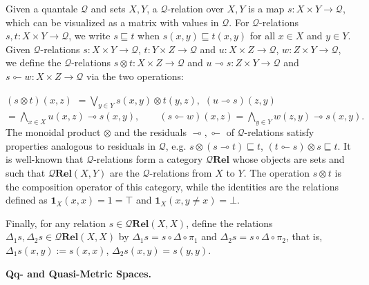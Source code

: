 Given a quantale $\mathcal{Q}$ and sets $X,Y$, a $\mathcal{Q}$-relation over $X,Y$ is a map $s\colon X\times Y\to\mathcal{Q}$, which can be visualized as a matrix with values in $\mathcal{Q}$. For $\mathcal{Q}$-relations $s,t\colon X\times Y\to\mathcal{Q}$, we write $s\sqsubseteq t$ when $s(x,y)\sqsubseteq t(x,y)$ for all $x\in X$ and $y\in Y$. Given $\mathcal{Q}$-relations $s\colon X\times Y\to\mathcal{Q}$, $t\colon Y\times Z\to\mathcal{Q}$ and $u\colon X\times Z\to\mathcal{Q}$, $w\colon Z\times Y\to\mathcal{Q}$, we define the $\mathcal{Q}$-relations $s\otimes t\colon X\times Z\to\mathcal{Q}$ and $u\multimap s\colon Z\times Y\to\mathcal{Q}$ and $s\multimapinv w\colon X\times Z\to\mathcal{Q}$ via the two operations:\par
    $\displaystyle(s\otimes t)(x,z)$ $\displaystyle=\bigvee_{y\in Y}s(x,y)\otimes t(y,z),$     $\displaystyle(u\multimap s)(z,y)$ $\displaystyle=\bigwedge_{x\in X}u(x,z)\multimap s(x,y),\qquad(s\multimapinv w)%
(x,z)=\bigwedge_{y\in Y}w(z,y)\multimap s(x,y).$    
The monoidal product $\otimes$ and the residuals $\multimap,\multimapinv$ of $\mathcal{Q}$-relations satisfy properties analogous to residuals in $\mathcal{Q}$, e.g. $s\otimes(s\multimap t)\sqsubseteq t$, $(t\multimapinv s)\otimes s\sqsubseteq t$. It is well-known that $\mathcal{Q}$-relations form a category $\mathcal{Q}\textbf{Rel}$ whose objects are sets and such that $\mathcal{Q}\textbf{Rel}(X,Y)$ are the $\mathcal{Q}$-relations from $X$ to $Y$. The operation $s\otimes t$ is the composition operator of this category, while the identities are the relations defined as $\mathbf{1}_{X}(x,x)=1=\top$ and $\mathbf{1}_{X}(x,y\neq x)=\bot$.\par
 
 
 
Finally, for any relation $s\in\mathcal{Q}\mathbf{Rel}(X,X)$, define the relations $\Delta_{1}s,\Delta_{2}s\in\mathcal{Q}\mathbf{Rel}(X,X)$ by $\Delta_{1}s=s\circ\Delta\circ\pi_{1}$ and $\Delta_{2}s=s\circ\Delta\circ\pi_{2}$, that is, $\Delta_{1}s(x,y):=s(x,x)$, $\Delta_{2}s(x,y)=s(y,y)$.\par
 
 
 
 
\par\medskip\noindent\textbf{Qq- and Quasi-Metric Spaces.}\par
 

